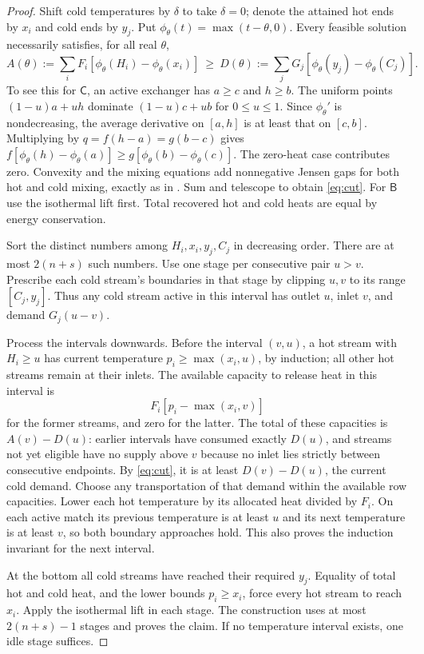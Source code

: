 \documentclass[11pt,a4paper]{report}
\newcommand{\CC}{\mathsf{C}}
\newcommand{\BB}{\mathsf{B}}
\begin{document}
\begin{proof}
Shift cold temperatures by $\delta$ to take $\delta=0$; denote the attained
hot ends by $x_i$ and cold ends by $y_j$. Put $\phi_\theta(t)=\max(t-\theta,0)$.
Every feasible solution necessarily satisfies, for all real $\theta$,
\begin{equation}\label{eq:cut}
 A(\theta):=\sum_iF_i[\phi_\theta(H_i)-\phi_\theta(x_i)]
 \ \geq\
 D(\theta):=\sum_jG_j[\phi_\theta(y_j)-\phi_\theta(C_j)].
\end{equation}
To see this for $\CC$, an active exchanger has $a\geq c$ and $h\geq b$.
The uniform points $(1-u)a+uh$ dominate $(1-u)c+ub$ for $0\leq u\leq1$.
Since $\phi_\theta'$ is nondecreasing, the average derivative on $[a,h]$
is at least that on $[c,b]$. Multiplying by $q=f(h-a)=g(b-c)$ gives
$f[\phi_\theta(h)-\phi_\theta(a)]\geq
g[\phi_\theta(b)-\phi_\theta(c)]$.
The zero-heat case contributes zero. Convexity and the mixing equations add
nonnegative Jensen gaps for both hot and cold mixing, exactly as in
\zcref{lem:quad}. Sum and telescope to obtain \eqref{eq:cut}.
For $\BB$ use the isothermal lift first. Total recovered hot and cold heats
are equal by energy conservation.

Sort the distinct numbers among $H_i,x_i,y_j,C_j$ in decreasing order.
There are at most $2(n+s)$ such numbers. Use one stage per consecutive pair
$u>v$. Prescribe each cold stream's boundaries in that stage by clipping
$u,v$ to its range $[C_j,y_j]$. Thus any cold stream active in this interval
has outlet $u$, inlet $v$, and demand $G_j(u-v)$.

Process the intervals downwards. Before the interval $(v,u)$, a hot stream
with $H_i\geq u$ has current temperature $p_i\geq\max(x_i,u)$, by induction;
all other hot streams remain at their inlets. The available capacity to
release heat in this interval is
\begin{equation}
 F_i[p_i-\max(x_i,v)]
\end{equation}
for the former streams, and zero for the latter. The total of these
capacities is $A(v)-D(u)$: earlier intervals have consumed exactly $D(u)$,
and streams not yet eligible have no supply above $v$ because no inlet
lies strictly between consecutive endpoints. By \eqref{eq:cut}, it is at
least $D(v)-D(u)$, the current cold demand. Choose any transportation of
that demand within the available row capacities. Lower each hot temperature
by its allocated heat divided by $F_i$. On each active match its previous
temperature is at least $u$ and its next temperature is at least $v$, so
both boundary approaches hold. This also proves the induction invariant
for the next interval.

At the bottom all cold streams have reached their required $y_j$. Equality
of total hot and cold heat, and the lower bounds $p_i\geq x_i$, force every
hot stream to reach $x_i$. Apply the isothermal lift in each stage. The
construction uses at most $2(n+s)-1$ stages and proves the claim. If no
temperature interval exists, one idle stage suffices.
\end{proof}
\end{document}
